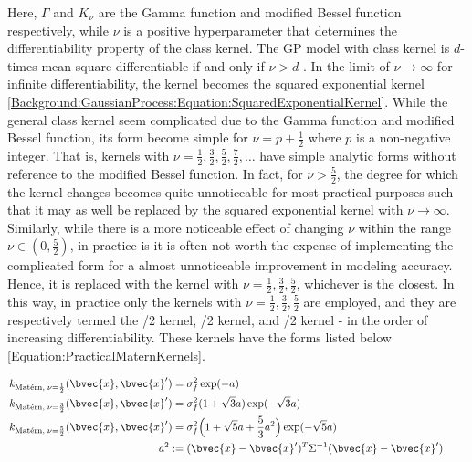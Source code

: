 				Here, $\Gamma$ and $K_{\nu}$ are the Gamma function and modified Bessel function respectively, while $\nu$ is a positive hyperparameter that determines the differentiability property of the \matern class kernel. The GP model with \matern class kernel is $d$-times mean square differentiable if and only if $\nu > d$ \citep{GaussianProcessForMachineLearning}. In the limit of $\nu \rightarrow \infty$ for infinite differentiability, the \matern kernel becomes the squared exponential kernel \eqref{Background:GaussianProcess:Equation:SquaredExponentialKernel}. While the general \matern class kernel seem complicated due to the Gamma function and modified Bessel function, its form become simple for $\nu = p + \frac{1}{2}$ where $p$ is a non-negative integer. That is, \matern kernels with $\nu = \frac{1}{2}, \frac{3}{2}, \frac{5}{2}, \frac{7}{2}, \dots$ have simple analytic forms without reference to the modified Bessel function. In fact, for $\nu > \frac{5}{2}$, the degree for which the \matern kernel changes becomes quite unnoticeable for most practical purposes such that it may as well be replaced by the squared exponential kernel with $\nu \rightarrow \infty$. Similarly, while there is a more noticeable effect of changing $\nu$ within the range $\nu \in (0, \frac{5}{2})$, in practice is it is often not worth the expense of implementing the complicated form for a almost unnoticeable improvement in modeling accuracy. Hence, it is replaced with the \matern kernel with $\nu = \frac{1}{2}, \frac{3}{2}, \frac{5}{2}$, whichever is the closest. In this way, in practice only the \matern kernels with $\nu = \frac{1}{2}, \frac{3}{2}, \frac{5}{2}$ are employed, and they are respectively termed the /2 kernel, /2 kernel, and /2 kernel - in the order of increasing differentiability. These kernels have the forms listed below \eqref{Equation:PracticalMaternKernels}.
				
				\begin{equation}
					\left.
						\begin{aligned}
							k_{\mathrm{\maternmath}, \; \nu = \frac{1}{2}}(\bvec{x}, \bvec{x}') =& \; \sigma_{f}^{2} \exp ( -a ) \\
							k_{\mathrm{\maternmath}, \; \nu = \frac{3}{2}}(\bvec{x}, \bvec{x}') =& \; \sigma_{f}^{2} (1 + \sqrt{3} a) \exp ( -\sqrt{3} a ) \\
							k_{\mathrm{\maternmath}, \; \nu = \frac{5}{2}}(\bvec{x}, \bvec{x}') =& \; \sigma_{f}^{2} \Big(1 + \sqrt{5} a + \frac{5}{3} a^{2}\Big) \exp ( -\sqrt{5} a )  \\
							a^{2} :=& \; (\bvec{x} - \bvec{x}')^{T} \Sigma^{-1} (\bvec{x} - \bvec{x}')
						\end{aligned}
					\qquad \right.
				\label{Equation:PracticalMaternKernels}
				\end{equation}			
				
